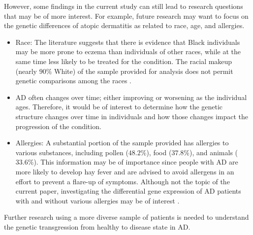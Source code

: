 \documentclass[journal, a4paper]{IEEEtran}
\begin{document}
However, some findings in the current study can still lead to research questions that may be of more interest. For example, future research may want to focus on the genetic differences of atopic dermatitis as related to race, age, and allergies.
\begin{itemize}
  \item Race: The literature suggests that there is evidence that Black individuals may be more prone to eczema than individuals of other races, while at the same time less likely to be treated for the condition. The racial makeup (nearly $90\%$ White) of the sample provided for analysis does not permit genetic comparisons among the races \cite{Eczema, fischer2017racial}.
  \item AD often changes over time; either improving or worsening as the individual ages. Therefore, it would be of interest to determine how the genetic structure changes over time in individuals and how those changes impact the progression of the condition.
  \item Allergies:  A substantial portion of the sample provided has allergies to various substances, including pollen ($48.2\%$), food ($37.8\%$), and animals ($33.6\%$). This information may be of importance since people with AD are more likely to develop hay fever and are advised to avoid allergens in an effort to prevent a flare-up of symptoms. Although not the topic of the current paper, investigating the differential gene expression of AD patients with and without various allergies may be of interest \cite{whatstoknow}.
\end{itemize}

Further research using a more diverse sample of patients is needed to understand the genetic transgression from healthy to disease state in AD. 



\end{document}
